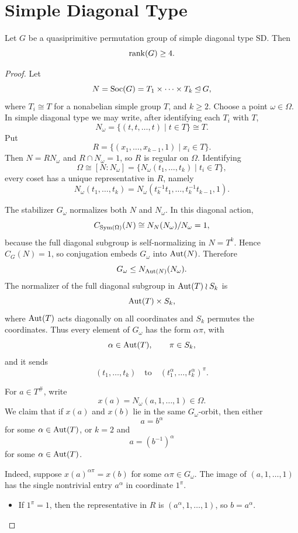 \section{Simple Diagonal Type}

\begin{lemma}\label{lem:sd-rank-at-least-four}
Let $G$ be a quasiprimitive permutation group of simple diagonal type $\mathrm{SD}$.  Then
\[
    \operatorname{rank}(G)\geq 4.
\]
\end{lemma}

\begin{proof}
Let
\[
    N=\operatorname{Soc}(G)=T_1\times \cdots\times T_k\unlhd G,
\]
where $T_i\cong T$ for a nonabelian simple group $T$, and $k\geq 2$.  Choose a point $\omega\in\Omega$.  In simple diagonal type we may write, after identifying each $T_i$ with $T$,
\[
    N_\omega=\{(t,t,\ldots,t)\mid t\in T\}\cong T.
\]
Put
\[
    R=\{(x_1,\ldots,x_{k-1},1)\mid x_i\in T\}.
\]
Then $N=RN_\omega$ and $R\cap N_\omega=1$, so $R$ is regular on $\Omega$.  Identifying
\[
    \Omega\cong [N:N_\omega]
        =\{N_\omega(t_1,\ldots,t_k)\mid t_i\in T\},
\]
every coset has a unique representative in $R$, namely
\[
    N_\omega(t_1,\ldots,t_k)
    =N_\omega(t_k^{-1}t_1,\ldots,t_k^{-1}t_{k-1},1).
\]

The stabilizer $G_\omega$ normalizes both $N$ and $N_\omega$.  In this diagonal action,
\[
    C_{\operatorname{Sym}(\Omega)}(N)\cong N_N(N_\omega)/N_\omega=1,
\]
because the full diagonal subgroup is self-normalizing in $N=T^k$.  Hence $C_G(N)=1$, so conjugation embeds $G_\omega$ into $\operatorname{Aut}(N)$.  Therefore
\[
    G_\omega\leq N_{\operatorname{Aut}(N)}(N_\omega).
\]
The normalizer of the full diagonal subgroup in $\operatorname{Aut}(T)\wr S_k$ is
\[
    \operatorname{Aut}(T)\times S_k,
\]
where $\operatorname{Aut}(T)$ acts diagonally on all coordinates and $S_k$ permutes the coordinates.  Thus every element of $G_\omega$ has the form $\alpha\pi$, with
\[
    \alpha\in\operatorname{Aut}(T),\qquad \pi\in S_k,
\]
and it sends
\[
    (t_1,\ldots,t_k)\quad\text{to}\quad (t_1^\alpha,\ldots,t_k^\alpha)^\pi.
\]

For $a\in T^\#$, write
\[
    x(a)=N_\omega(a,1,\ldots,1)\in\Omega.
\]
We claim that if $x(a)$ and $x(b)$ lie in the same $G_\omega$-orbit, then either
\[
    a=b^\alpha
\]
for some $\alpha\in\operatorname{Aut}(T)$, or $k=2$ and
\[
    a=(b^{-1})^\alpha
\]
for some $\alpha\in\operatorname{Aut}(T)$.

Indeed, suppose $x(a)^{\alpha\pi}=x(b)$ for some $\alpha\pi\in G_\omega$.  The image of $(a,1,\ldots,1)$ has the single nontrivial entry $a^\alpha$ in coordinate $1^\pi$.

\begin{itemize}[leftmargin=2em]
    \item If $1^\pi=1$, then the representative in $R$ is $(a^\alpha,1,\ldots,1)$, so $b=a^\alpha$.


\end{itemize}
\end{proof}
